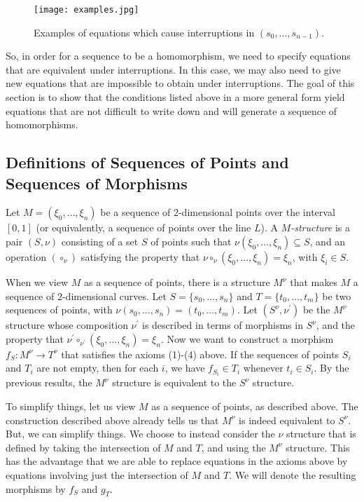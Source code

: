 \documentclass[a4paper,reqno,oneside]{article}
\begin{document}
\begin{figure}[ht]
\centering
\texttt{[image: examples.jpg]}
\caption{Examples of equations which cause interruptions in $\left({s_0,\ldots,s_{n-1}}\right)$.}
\label{fig:example}
\end{figure}


So, in order for a sequence to be a homomorphism, we need to specify equations that are equivalent under interruptions.  In this case, we may also need to give new equations that are impossible to obtain under interruptions.  The goal of this section is to show that the conditions listed above in a more general form yield equations that are not difficult to write down and will generate a sequence of homomorphisms.  




\subsection{Definitions of Sequences of Points and Sequences of Morphisms}\label{def:sequences}

Let $M=\left({\xi_0,\ldots,\xi_n}\right)$ be a sequence of $2$-dimensional points over the interval $[0,1]$ (or equivalently, a sequence of points over the line $L$).  A \emph{$M$-structure} is a pair $(S,\nu)$ consisting of a set $S$ of points such that $\nu(\xi_0,\ldots,\xi_n)\subseteq S$, and an operation $(\circ_\nu)$ satisfying the property that $\nu \circ_\nu (\xi_0,\ldots,\xi_n) =\xi_{n}$, with $\xi_i\in S$.

When we view $M$ as a sequence of points, there is a structure $M^\nu$ that makes $M$ a sequence of $2$-dimensional curves.  Let $S=\{s_0,\ldots,s_n\}$ and $T=\{t_0,\ldots,t_m\}$ be two sequences of points, with $\nu(s_0,\ldots,s_n)=(t_0,\ldots,t_m)$.  Let $(S^\nu,\nu^\prime)$ be the $M^\nu$ structure whose composition $\nu^\prime$ is described in terms of morphisms in $S^\nu$, and the property that $\nu^\prime \circ_{\nu^\prime}(\xi_0,\ldots,\xi_n)=\xi_n$.  Now we want to construct a morphism $f_S : M^\nu \rightarrow T^\nu$ that satisfies the axioms (1)-(4) above.  If the sequences of points $S_i$ and $T_i$ are not empty, then for each $i$, we have $f_{S_i} \in T_i$ whenever $t_i \in S_i$.  By the previous results, the $M^\nu$ structure is equivalent to the $S^\nu$ structure.

To simplify things, let us view $M$ as a sequence of points, as described above.  The construction described above already tells us that $M^\nu$ is indeed equivalent to $S^\nu$.  But, we can simplify things.  We choose to instead consider the $\nu$ structure that is defined by taking the intersection of $M$ and $T$, and using the $M^\nu$ structure.   This has the advantage that we are able to replace equations in the axioms above by equations involving just the intersection of $M$ and $T$.  We will denote the resulting morphisms by $f_S$ and $g_T$.
\end{document}
